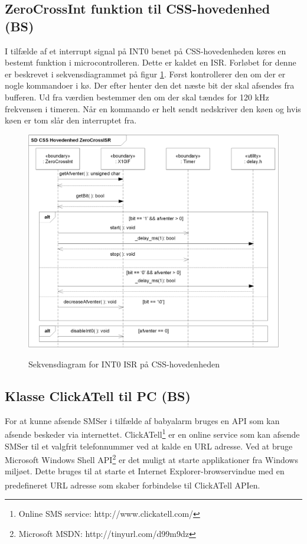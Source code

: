 \subsection{ZeroCrossInt funktion til CSS-hovedenhed (BS)}
I tilfælde af et interrupt signal på INT0 benet på CSS-hovedenheden køres en bestemt funktion i microcontrolleren. Dette er kaldet en ISR. Forløbet for denne er beskrevet i sekvensdiagrammet på figur \ref{fig:ZeroCrossISR}.
Først kontrollerer den om der er nogle kommandoer i kø. Der efter henter den det næste bit der skal afsendes fra bufferen. Ud fra værdien bestemmer den om der skal tændes for 120 kHz frekvensen i timeren. Når en kommando er helt sendt nedskriver den køen og hvis køen er tom slår den interruptet fra.

\begin{figure}[!htb]
     {\includegraphics[width=\textwidth]{billeder/uml/CSS_ZeroCrossInt_SD}}
     \caption{Sekvensdiagram for INT0 ISR på CSS-hovedenheden}
     \label{fig:ZeroCrossISR}
\end{figure}

\subsection{Klasse ClickATell til PC (BS)}
For at kunne afsende SMSer i tilfælde af babyalarm bruges en API som kan afsende beskeder via internettet.
ClickATell\textsuperscript{\circledR}\footnote{Online SMS service: http://www.clickatell.com/} er en online service som kan afsende SMSer til et valgfrit telefonnummer ved at kalde en URL adresse.
Ved at bruge Microsoft Windows Shell API\footnote{Microsoft MSDN: http://tinyurl.com/d99m9dz} er det muligt at starte applikationer fra Windows miljøet. Dette bruges til at starte et Internet Explorer-browservindue med en predefineret URL adresse som skaber forbindelse til ClickATell\textsuperscript{\circledR} APIen. 

